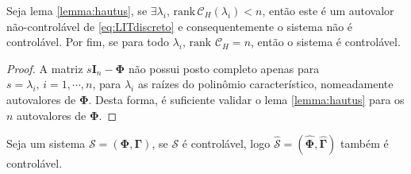     \begin{proposition}
        Seja lema \ref{lemma:hautus}, se $\exists \lambda_i, \, \mathrm{rank} \, \mathcal{C}_H (\lambda_i) < n$, então este é um autovalor não-controlável de \eqref{eq:LITdiscreto} e consequentemente o sistema não é controlável. Por fim, se para todo $\lambda_i$, $\mathrm{rank} \,\, \mathcal{C}_H = n$, então o sistema é controlável. 
    \end{proposition}

    \begin{proof}
        \label{proof:hautus}
        A matriz $s \mathbf{I}_n - \mathbf{\Phi}$ não possui posto completo apenas para $s = \lambda_i, \, i = 1, \cdots, n$, para $\lambda_i$ as raízes do polinômio característico, nomeadamente autovalores de $\mathbf{\Phi}$. Desta forma, é suficiente validar o lema \ref{lemma:hautus} para os $n$ autovalores de $\mathbf{\Phi}$.
    \end{proof}

    \begin{proposition}
        Seja um sistema $\mathcal{S} = (\mathbf{\Phi}, \mathbf{\Gamma})$, se $\mathcal{S}$ é controlável, logo $ \mathcal{\hat S} = (\mathbf{\hat \Phi}, \mathbf{\hat \Gamma})$ também é controlável.
    \end{proposition}

